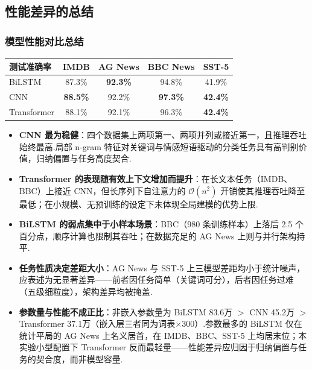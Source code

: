 \documentclass{模版}
\begin{document}
\subsection{性能差异的总结}
\begin{frame}\frametitle{模型性能对比总结}
\begin{table}[H]
    \centering
    \small
    \begin{tabular}{lcccc}
        \toprule
        \textbf{测试准确率} & IMDB & AG News & BBC News & SST-5 \\
        \midrule
        BiLSTM & 87.3\% & \textbf{92.3\%} & 94.8\% & 41.9\% \\
        CNN & \textbf{88.5\%} & 92.2\% & \textbf{97.3\%} & \textbf{42.4\%} \\
        Transformer & 88.1\% & 92.1\% & 96.3\% & \textbf{42.4\%} \\
        \bottomrule
    \end{tabular}
\end{table}
\begin{itemize}
    \fontsize{8pt}{10pt}\selectfont
\item \textbf{CNN 最为稳健}：四个数据集上两项第一、两项并列或接近第一，且推理吞吐始终最高.局部 n-gram 特征对关键词与情感短语驱动的分类任务具有高判别价值，归纳偏置与任务高度契合.
\item \textbf{Transformer 的表现随有效上下文增加而提升}：在长文本任务（IMDB、BBC）上接近 CNN，但长序列下自注意力的 $\mathcal{O}(n^2)$ 开销使其推理吞吐降至最低；在小规模、无预训练的设定下未体现全局建模的优势上限.
\item \textbf{BiLSTM 的弱点集中于小样本场景}：BBC（980 条训练样本）上落后 2.5 个百分点，顺序计算也限制其吞吐；在数据充足的 AG News 上则与并行架构持平.
\item \textbf{任务性质决定差距大小}：AG News 与 SST-5 上三模型差距均小于统计噪声，应表述为无显著差异——前者因任务简单（关键词可分），后者因任务过难（五级细粒度），架构差异均被掩盖.
\item \textbf{参数量与性能不成正比}：非嵌入参数量为 BiLSTM 83.6万 $>$ CNN 45.2万 $>$ Transformer 37.1万（嵌入层三者同为词表$\times$300）.参数最多的 BiLSTM 仅在统计平局的 AG News 上名义居首，在 IMDB、BBC、SST-5 上均居末位；本实验小型配置下 Transformer 反而最轻量——性能差异应归因于归纳偏置与任务的契合度，而非模型容量.
\end{itemize}
\end{frame}
\end{document}
